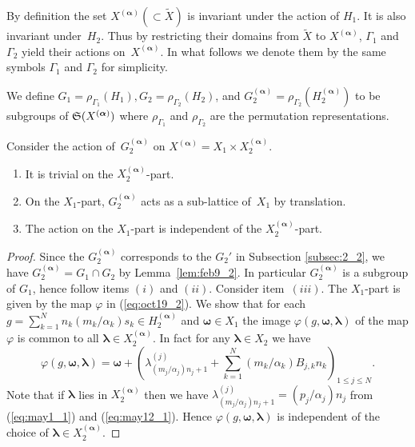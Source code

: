 \documentclass[pdftex]{sigma}
\newcommand\bom{\boldsymbol{\omega}}
\newcommand\bol{\boldsymbol{\lambda}}
\newcommand\boa{\boldsymbol{\alpha}}
\begin{document}
By def\/inition the set $X^{(\boa)} (\subset \tilde{X})$ is invariant under the action of $H_1$.
It is also invariant under~$H_2$.
Thus by restricting their domains from $\tilde{X}$ to $X^{(\boa)}$, $\varGamma_1$ and $\varGamma_2$
yield their actions on~$X^{(\boa)}$.
In what follows we denote them by the same symbols $\varGamma_1$ and $\varGamma_2$
for simplicity.

We def\/ine
$G_1 = \rho_{\varGamma_1} (H_1), G_2 = \rho_{\varGamma_2} (H_2)$, and
$G_2^{(\boa)} = \rho_{\varGamma_2} (H_2^{(\boa)})$
to be subgroups of ${\frak S}(X^{(\boa)})$
where $\rho_{\varGamma_1}$ and $\rho_{\varGamma_2}$ are
the permutation representations.

\begin{lemma}\label{lem:oct19_1}
Consider the action of~$G_2^{(\boa)}$ on $X^{(\boa)}= X_1 \times X_2^{(\boa)}$.
\begin{enumerate}\itemsep=0pt
\item It is trivial on the $X_2^{(\boa)}$-part.
\item On the $X_1$-part, $G_2^{(\boa)}$ acts as a sub-lattice of~$X_1$ by translation.
\item The action on the $X_1$-part is independent of the $X_2^{(\boa)}$-part.
\end{enumerate}
\end{lemma}

\begin{proof}
Since the $G_2^{(\boa)}$ corresponds to the $G_2'$ in Subsection \ref{subsec:2_2}, we have
$G_2^{(\boa)} = G_1 \cap G_2$ by Lemma~\ref{lem:feb9_2}.
In particular $G_2^{(\boa)}$ is a subgroup of $G_1$, hence follow items $(i)$ and $(ii)$.
Consider item~$(iii)$.
The $X_1$-part is given by the map $\varphi$ in (\ref{eq:oct19_2}).
We show that
for each $g = \sum_{k=1}^N n_k (m_k/\alpha_k) s_k \in H_2^{(\boa)}$
and $\bom \in X_1$ the image $\varphi(g,\bom,\bol)$ of the map $\varphi$
is common to all $\bol \in X_2^{(\boa)}$.
In fact for any $\bol \in X_2$
we have
\begin{equation}\label{eq:may1_2}
\varphi(g,\bom,\bol) = \bom + \left(
\lambda^{(j)}_{(m_j/\alpha_j) n_j+1} + \sum_{k=1}^N (m_k/\alpha_k) B_{j,k} n_k
\right)_{1 \leq j \leq N}.
\end{equation}
Note that if $\bol$ lies in $X_2^{(\boa)}$ then we have $\lambda^{(j)}_{(m_j/\alpha_j) n_j+1} = (p_j/\alpha_j) n_j$ from
(\ref{eq:may1_1}) and (\ref{eq:may12_1}).
Hence
$\varphi(g,\bom,\bol)$ is independent of the choice of $\bol \in X_2^{(\boa)}$.
\end{proof}
\end{document}
